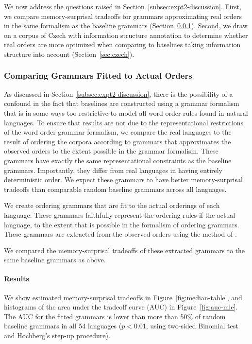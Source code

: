 

We now address the questions raised in Section~\ref{subsec:expt2-discussion}.
First, we compare memory-surprisal tradeoffs for grammars approximating real orders in the same formalism as the baseline grammars (Section~\ref{sec:compare-mle}).
Second, we draw on a corpus of Czech with information structure annotation to determine whether real orders are more optimized when comparing to baselines taking information structure into account (Section~\ref{sec:czech}).


\subsubsection{Comparing Grammars Fitted to Actual Orders}\label{sec:compare-mle}

As discussed in Section~\ref{subsec:expt2-discussion}, there is the possibility of a confound in the fact that baselines are constructed using a grammar formalism that is in some ways too restrictive to model all word order rules found in natural languages.
To ensure that results are not due to the representational restrictions of the word order grammar formalism, we compare the real languages to the result of ordering the corpora according to grammars that approximates the observed orders to the extent possible in the grammar formalism.
These grammars have exactly the same representational constraints as the baseline grammars.
Importantly, they differ from real languages in having entirely deterministic order.
We expect these grammars to have better memory-surprisal tradeoffs than comparable random baseline grammars across all languages.

We create ordering grammars that are fit to the actual orderings of each language.
These grammars faithfully represent the ordering rules if the actual language, to the extent that is possible in the formalism of ordering grammars.
These grammars are extracted from the observed orders using the method of \cite{hahn2020optimization}.

We compared the memory-surprisal tradeoffs of these extracted grammars to the same baseline grammars as above.


\paragraph{Results}


We show estimated memory-surprisal tradeoffs in Figure~\ref{fig:median-table}, and histograms of the area under the tradeoff curve (AUC) in Figure~\ref{fig:auc-mle}.
The AUC for the fitted grammars is lower than more than 50\% of random baseline grammars in all 54 languages ($p < 0.01$, using two-sided Binomial test and Hochberg's step-up procedure).

